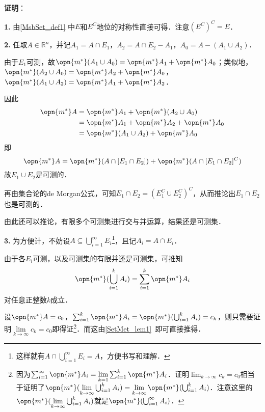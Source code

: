 \textbf{证明}：


\textbf{1.} 由\autoref{MsbSet_def1} 中$E$和$E^C$地位的对称性直接可得．注意$(E^C)^C=E$．

\textbf{2.} 任取$A\in\mathbb{R}^n$，并记$A_1=A\cap E_1$，$A_2=A\cap E_2-A_1$，$A_0=A-(A_1\cup A_2)$．


由于$E_1$可测，故$\opn{m^*}(A_1\cup A_0)=\opn{m^*}A_1+\opn{m^*}A_0$；类似地，$\opn{m^*}(A_2\cup A_0)=\opn{m^*}A_2+\opn{m^*}A_0$，$\opn{m^*}(A_1\cup A_2)=\opn{m^*}A_1+\opn{m^*}A_2$．

因此
\begin{equation}
\begin{aligned}
\opn{m^*}A&=\opn{m^*}A_1+\opn{m^*}(A_2\cup A_0)\\
&=\opn{m^*}A_1+\opn{m^*}A_2+\opn{m^*}A_0\\
&=\opn{m^*}(A_1\cup A_2)+\opn{m^*}A_0
\end{aligned}
\end{equation}
即
\begin{equation}
\opn{m^*}A=\opn{m^*}(A\cap [E_1\cap E_2])+\opn{m^*}(A\cap [E_1\cap E_2]^C)
\end{equation}
故$E_1\cup E_2$是可测的．

再由集合论的de Morgan公式，可知$E_1\cap E_2=(E_1^C\cup E_2^C)^C$，从而推论出$E_1\cap E_2$也是可测的．

由此还可以推论，有限多个可测集进行交与并运算，结果还是可测集．

\textbf{3.} 为方便计，不妨设$A\subseteq \bigcup_{i=1}^\infty E_i$\footnote{这样就有$A\cap \bigcup_{i=1}^{\infty}E_i=A$，方便书写和理解．}，且记$A_i=A\cap E_i$．

由于各$E_i$可测，以及可测集的有限并还是可测集，可推知
\begin{equation}
\opn{m^*}(\bigcup_{i=1}^k A_i)=\sum_{i=1}^k \opn{m^*}A_i
\end{equation}
对任意正整数$k$成立．

设$\opn{m^*}A=c_0$，$\sum_{i=1}^k \opn{m^*}A_i=\opn{m^*}(\bigcup_{i=1}^k A_i)=c_k$，则只需要证明$\lim\limits_{k\to \infty}c_k=c_0$即得证\footnote{因为$\sum_{i=1}^\infty \opn{m^*}A_i=\lim\limits_{k=1}\sum_{i=1}^k\opn{m^*}A_i$．证明$\lim_{k\to\infty}c_k=c_0$相当于证明了$\opn{m^*}(\lim\limits_{k\to\infty}\bigcup^k_{i=1}A_i)=\lim\limits_{k\to\infty}\opn{m^*}(\bigcup^k_{i=1}A_i)$．注意这里的$\opn{m^*}(\lim\limits_{k\to\infty}\bigcup^k_{i=1}A_i)$就是$\opn{m^*}(\bigcup^\infty_{i=1}A_i)$．}．而这由\autoref{SetMet_lem1}~即可直接推得．%

